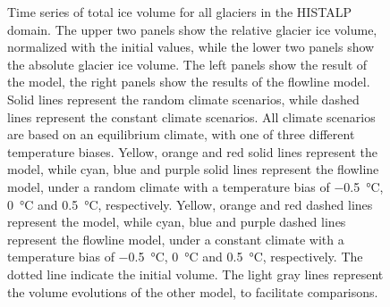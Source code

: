 \begin{figure}[htp]
      \caption{Time series of total ice volume for all glaciers in the HISTALP domain. The upper two panels show the relative glacier ice volume, normalized with the initial values, while the lower two panels show the absolute glacier ice volume. The left panels show the result of the \vas{} model, the right panels show the results of the flowline model. Solid lines represent the random climate scenarios, while dashed lines represent the constant climate scenarios. All climate scenarios are based on an equilibrium climate, with one of three different temperature biases.
      Yellow, orange and red solid lines represent the \vas{} model, while cyan, blue and purple solid lines represent the flowline model, under a random climate with a temperature bias of \SI{-.5}{\celsius}, \SI{0}{\celsius} and \SI{+.5}{\celsius}, respectively. Yellow, orange and red dashed lines represent the \vas{} model, while cyan, blue and purple dashed lines represent the flowline model, under a constant climate with a temperature bias of \SI{-.5}{\celsius}, \SI{0}{\celsius} and \SI{+.5}{\celsius}, respectively. %
      The dotted line indicate the initial volume. The light gray lines represent the volume evolutions of the other model, to facilitate comparisons.}
      \label{fig:histalp_projection}
    \end{figure}







